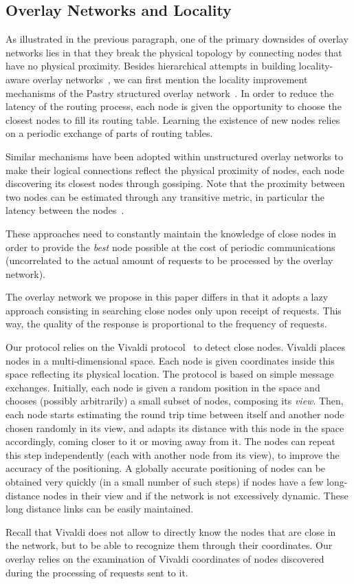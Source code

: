 
\subsection{Overlay Networks and Locality}

As illustrated in the previous paragraph, one of the primary downsides of overlay networks
lies in that they break the physical topology by connecting nodes that have no physical
proximity.
%
Besides hierarchical attempts in building locality-aware overlay
networks~\cite{superchord,XuMK03,ECAN}, we can first mention the locality
improvement mechanisms of the Pastry structured overlay
network~\cite{pastry}. In order to reduce the latency of the routing process,
each node is given the opportunity to choose the closest nodes to fill its
routing table. Learning the existence of new nodes relies on a periodic exchange
of parts of routing tables.

Similar mechanisms have been adopted within unstructured overlay networks to make their
logical connections reflect the physical proximity of nodes, each node discovering its
closest nodes through gossiping. Note that the proximity between two nodes can be
estimated through any transitive metric, in particular the latency between the
nodes~\cite{tman}.

These approaches need to constantly maintain the knowledge of close nodes in order to
provide the \emph{best} node possible at the cost of periodic communications (uncorrelated
to the actual amount of requests to be processed by the overlay network).

The overlay network we propose in this paper differs in that it adopts a lazy approach consisting
in searching close nodes only upon receipt of requests. This way, the quality of the response
is proportional to the frequency of requests.

Our protocol relies on the Vivaldi protocol~\cite{dabek:2001:sigcomm04} to detect close
nodes. Vivaldi places nodes in a multi-dimensional space. Each node is given coordinates
inside this space reflecting its physical location. The protocol is based on simple
message exchanges. Initially, each node is given a random position in the space and
chooses (possibly arbitrarily) a small subset of nodes, composing its \emph{view}. Then,
each node starts estimating the round trip time between itself and another node chosen
randomly in its view, and adapts its distance with this node in the space accordingly,
coming closer to it or moving away from it. The nodes can repeat this step
independently (each with another node from its view), to improve the accuracy of the
positioning. A globally accurate positioning of nodes can be obtained very quickly (in a
small number of such steps) if nodes have a few long-distance nodes in their view and if the
network is not excessively dynamic. These long distance links can be easily maintained.

Recall that Vivaldi does not allow to directly know the nodes that are close in
the network, but to be able to recognize them through their coordinates. Our
overlay relies on the examination of Vivaldi coordinates of nodes discovered
during the processing of requests sent to it.






